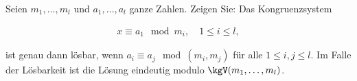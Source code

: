 
\begin{exercise}

Seien $m_1,\dots,m_l$ und $a_1,\dots,a_l$ ganze Zahlen. Zeigen Sie:
Das Kongruenzsystem 

\begin{align*}
    x \equiv a_1 \mod{m_i}, \quad 1 \leq i \leq l,
\end{align*}

ist genau dann lösbar, wenn $a_i \equiv a_j \mod{(m_i,m_j)}$
für alle $1 \leq i, j \leq l$. Im Falle der Lösbarkeit ist die
Lösung eindeutig modulo $\kgV(m_1,\dots,m_l)$.

\end{exercise}


\begin{solution}

\phantom{}

\end{solution}

